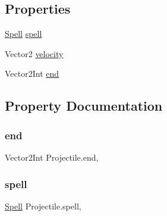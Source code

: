 \subsection*{Properties}
\begin{DoxyCompactItemize}
\item 
\mbox{\hyperlink{class_spell}{Spell}} \mbox{\hyperlink{class_projectile_adf481201408f58e0fe934bfe0e47229f}{spell}}
\item 
Vector2 \mbox{\hyperlink{class_projectile_a2d9755facfa238e047de85c626587cd2}{velocity}}
\item 
Vector2\+Int \mbox{\hyperlink{class_projectile_a488a27f52325780f1315b5c64949d9ca}{end}}
\end{DoxyCompactItemize}


\subsection{Property Documentation}
\mbox{\label{class_projectile_a488a27f52325780f1315b5c64949d9ca}} 
\subsubsection{\texorpdfstring{end}{end}}
{\footnotesize\ttfamily Vector2\+Int Projectile.\+end\hspace{0.3cm}{\ttfamily [get]}, {\ttfamily [set]}}

\mbox{\label{class_projectile_adf481201408f58e0fe934bfe0e47229f}} 
\subsubsection{\texorpdfstring{spell}{spell}}
{\footnotesize\ttfamily \mbox{\hyperlink{class_spell}{Spell}} Projectile.\+spell\hspace{0.3cm}{\ttfamily [get]}, {\ttfamily [set]}}

\mbox{\label{class_projectile_a2d9755facfa238e047de85c626587cd2}} 
